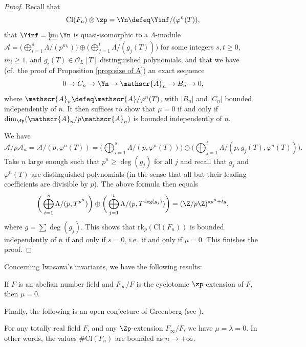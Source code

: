 \documentclass[a4paper,10pt, english, reqno]{smfart}
\numberwithin{equation}{section}
\begin{document}
\begin{proof}
 Recall that \[ \mathrm{Cl}(F_n) \otimes \zp = \Yn \defeq \Yinf / (\varphi^n(T)), \] that $\Yinf = \varprojlim \Yn$ is quasi-isomorphic to a $\Lambda$-module $\mathscr{A} = \big( \bigoplus_{i = 1}^s \Lambda / (p^{m_i}) \big) \oplus \big( \bigoplus_{j = 1}^t \Lambda / (g_j(T)) \big)$ for some integers $s, t \geq 0$, $m_i \geq 1$, and $g_i(T) \in \mathscr{O}_L[T]$ distinguished polynomials, and that we have (cf.\ the proof of Proposition \ref{prop:size of A}) an exact sequence
 \[ 0 \to C_n \to \Yn \to \mathscr{A}_n \to B_n \to 0, \] where $\mathscr{A}_n \defeq \mathscr{A} / \varphi^n(T)$, with $|B_n|$ and $|C_n|$ bounded independently of $n$. It then suffices to show that $\mu = 0$ if and only if $\dim_{\fp}(\mathscr{A}_n / p \mathscr{A}_n)$ is bounded independently of $n$.
 
 We have
 \[ \mathscr{A} / p \mathscr{A}_n = \mathscr{A} / (p, \varphi^n(T)) = \bigg( \bigoplus_{i = 1}^s \Lambda / (p, \varphi^n(T)) \bigg) \oplus \bigg( \bigoplus_{j = 1}^t \Lambda / (p, g_j(T), \varphi^n(T)) \bigg). \]
 Take $n$ large enough such that $p^n \geq \deg(g_j)$ for all $j$ and recall that $g_j$ and $\varphi^n(T)$ are distinguished polynomials (in the sense that all but their leading coefficients are divisible by $p$). The above formula then equals
 \[ \bigg( \bigoplus_{i = 1}^s \Lambda / (p, T^{p^n}) \bigg) \oplus \bigg( \bigoplus_{j = 1}^t \Lambda / (p, T^{\deg(g_j)})\bigg) = (\Z / p \Z)^{s p^n + t g}, \] 
where $g = \sum \deg(g_j)$. This shows that $\mathrm{rk}_p(\mathrm{Cl}(F_n))$ is bounded independently of $n$ if and only if $s = 0$, i.e.\ if and only if $\mu = 0$. This finishes the proof.
\end{proof}

Concerning Iwasawa's invariants, we have the following results:

\begin{theorem} 
If $F$ is an abelian number field and $F_\infty / F$ is the cyclotomic $\zp$-extension of $F$, then $\mu = 0$.
\end{theorem}


Finally, the following is an open conjecture of Greenberg (see \cite{Gre76}).
\begin{conj} [Greenberg]
For any totally real field $F$, and any $\Zp$-extension $F_\infty/F$, we have $\mu = \lambda = 0$. In other words, the values $\# \mathrm{Cl}(F_n)$ are bounded as $n \to +\infty$.
\end{conj} 
\end{document}
